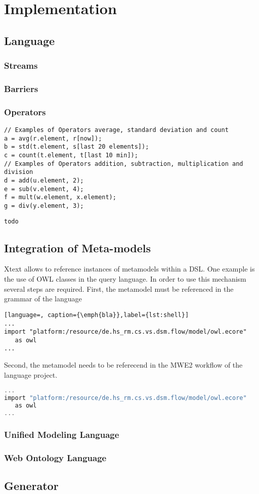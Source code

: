\section{Implementation}
\subsection{Language}
\subsubsection{Streams}
\subsubsection{Barriers}
\subsubsection{Operators}

\begin{lstlisting}[language=Flow, caption={\emph{Examples of Analysis Operators in Flow}},label={lst:exanflw}]
// Examples of Operators average, standard deviation and count
a = avg(r.element, r[now]);
b = std(t.element, s[last 20 elements]);
c = count(t.element, t[last 10 min]);
// Examples of Operators addition, subtraction, multiplication and division
d = add(u.element, 2);
e = sub(v.element, 4);
f = mult(w.element, x.element);
g = div(y.element, 3);
\end{lstlisting}

\begin{lstlisting}[language=Flow, caption={\emph{Examples of Analysis Operators in LUA}},label={lst:exanlua}]
todo
\end{lstlisting}


\subsection{Integration of Meta-models}
Xtext allows to reference instances of metamodels within a DSL. One example is 
the use of OWL classes in the query language. In order to use this mechanism 
several steps are required. First, the metamodel must be referenced in the 
grammar of the language
\begin{lstlisting}[language=, caption={\emph{bla}},label={lst:shell}]
...
import "platform:/resource/de.hs_rm.cs.vs.dsm.flow/model/owl.ecore"
   as owl
...
\end{lstlisting}
Second, the metamodel needs to be referecend in the MWE2 workflow of the 
language project.
\begin{lstlisting}[language=C, caption={\emph{bla}},label={lst:shell}]
...
import "platform:/resource/de.hs_rm.cs.vs.dsm.flow/model/owl.ecore"
   as owl
...
\end{lstlisting}

\subsubsection{Unified Modeling Language}
\subsubsection{Web Ontology Language}
\subsection{Generator}
